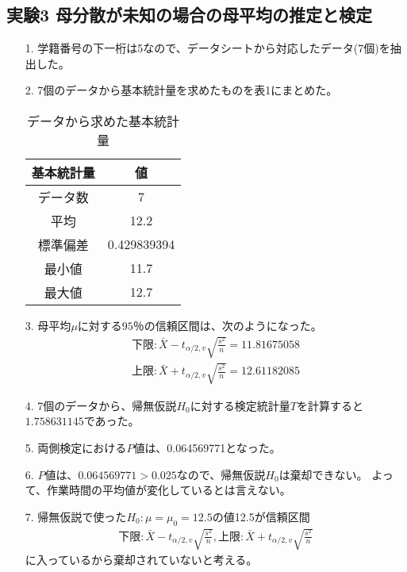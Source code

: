 \documentclass[12pt]{jarticle}
\begin{document}
\subsection{実験3 母分散が未知の場合の母平均の推定と検定}
\begin{itemize}
      \item [1.]学籍番号の下一桁は5なので、データシートから対応したデータ(7個)を抽出した。
      \item [2.]7個のデータから基本統計量を求めたものを表1にまとめた。
            \begin{table}[htb]
                  \begin{center}
                        \caption{データから求めた基本統計量}
                        \begin{tabular}{|c|c|} \hline
                              基本統計量 & 値          \\ \hline
                              データ数   & 7           \\
                              平均       & 12.2        \\
                              標準偏差   & 0.429839394 \\
                              最小値     & 11.7        \\
                              最大値     & 12.7        \\\hline
                        \end{tabular}
                  \end{center}
            \end{table}

      \item [3.]母平均$\mu$に対する$95％$の信頼区間は、次のようになった。
            \begin{eqnarray}
                  下限:\bar{X}-t_{\alpha/2,v}\sqrt{\frac{s^2}{n}}=11.81675058 \nonumber \\
                  上限:\bar{X}+t_{\alpha/2,v}\sqrt{\frac{s^2}{n}}=12.61182085 \nonumber
            \end{eqnarray}

      \item [4.]7個のデータから、帰無仮説$H_0$に対する検定統計量$T$を計算すると$1.758631145$であった。
      \item [5.]両側検定における$P値$は、0.064569771となった。
      \item [6.]$P値$は、$0.064569771>0.025$なので、帰無仮説$H_0$は棄却できない。
            よって、作業時間の平均値が変化しているとは言えない。
      \item [7.]帰無仮説で使った$H_0:\mu=\mu_0=12.5$の値12.5が信頼区間
            \begin{eqnarray}
                  下限:\bar{X}-t_{\alpha/2,v}\sqrt{\frac{s^2}{n}},　上限:\bar{X}+t_{\alpha/2,v}\sqrt{\frac{s^2}{n}}\nonumber
            \end{eqnarray}
            に入っているから棄却されていないと考える。
\end{itemize}
\end{document}
